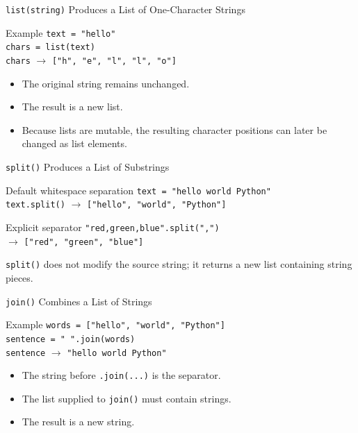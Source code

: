 \documentclass[aspectratio=169,10pt]{beamer}
\begin{document}

\begin{frame}{\texttt{list(string)} Produces a List of One-Character Strings}
  \begin{block}{Example}
    \texttt{text = "hello"}\\
    \texttt{chars = list(text)}\\[0.08in]
    \texttt{chars} $\longrightarrow$ \texttt{["h", "e", "l", "l", "o"]}
  \end{block}

  \begin{itemize}
    \item The original string remains unchanged.
    \item The result is a new list.
    \item Because lists are mutable, the resulting character positions can later be changed as list elements.
  \end{itemize}
\end{frame}

\begin{frame}{\texttt{split()} Produces a List of Substrings}
  \begin{block}{Default whitespace separation}
    \texttt{text = "hello world Python"}\\
    \texttt{text.split()} $\longrightarrow$ \texttt{["hello", "world", "Python"]}
  \end{block}

  \begin{block}{Explicit separator}
    \texttt{"red,green,blue".split(",")}\\
    $\longrightarrow$ \texttt{["red", "green", "blue"]}
  \end{block}

  \begin{keyidea}
    \texttt{split()} does not modify the source string; it returns a new list containing string pieces.
  \end{keyidea}
\end{frame}

\begin{frame}{\texttt{join()} Combines a List of Strings}
  \begin{block}{Example}
    \texttt{words = ["hello", "world", "Python"]}\\
    \texttt{sentence = " ".join(words)}\\[0.08in]
    \texttt{sentence} $\longrightarrow$ \texttt{"hello world Python"}
  \end{block}

  \begin{itemize}
    \item The string before \texttt{.join(...)} is the separator.
    \item The list supplied to \texttt{join()} must contain strings.
    \item The result is a new string.
  \end{itemize}
\end{frame}
\end{document}
